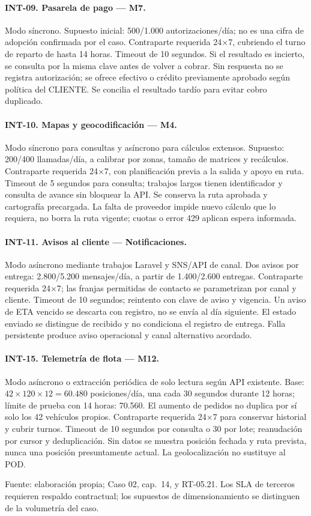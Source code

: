 \paragraph{INT-09. Pasarela de pago --- M7.}
Modo síncrono. Supuesto inicial: 500/1.000 autorizaciones/día; no es una cifra de adopción confirmada por el caso. Contraparte requerida 24$\times$7, cubriendo el turno de reparto de hasta 14 horas. Timeout de 10 segundos. Si el resultado es incierto, se consulta por la misma clave antes de volver a cobrar. Sin respuesta no se registra autorización; se ofrece efectivo o crédito previamente aprobado según política del CLIENTE. Se concilia el resultado tardío para evitar cobro duplicado.

\paragraph{INT-10. Mapas y geocodificación --- M4.}
Modo síncrono para consultas y asíncrono para cálculos extensos. Supuesto: 200/400 llamadas/día, a calibrar por zonas, tamaño de matrices y recálculos. Contraparte requerida 24$\times$7, con planificación previa a la salida y apoyo en ruta. Timeout de 5 segundos para consulta; trabajos largos tienen identificador y consulta de avance sin bloquear la API. Se conserva la ruta aprobada y cartografía precargada. La falta de proveedor impide nuevo cálculo que lo requiera, no borra la ruta vigente; cuotas o error 429 aplican espera informada.

\paragraph{INT-11. Avisos al cliente --- Notificaciones.}
Modo asíncrono mediante trabajos Laravel y SNS/API de canal. Dos avisos por entrega: 2.800/5.200 mensajes/día, a partir de 1.400/2.600 entregas. Contraparte requerida 24$\times$7; las franjas permitidas de contacto se parametrizan por canal y cliente. Timeout de 10 segundos; reintento con clave de aviso y vigencia. Un aviso de ETA vencido se descarta con registro, no se envía al día siguiente. El estado enviado se distingue de recibido y no condiciona el registro de entrega. Falla persistente produce aviso operacional y canal alternativo acordado.

\paragraph{INT-15. Telemetría de flota --- M12.}
Modo asíncrono o extracción periódica de solo lectura según API existente. Base: $42\times120\times12=60.480$ posiciones/día, una cada 30 segundos durante 12 horas; límite de prueba con 14 horas: 70.560. El aumento de pedidos no duplica por sí solo los 42 vehículos propios. Contraparte requerida 24$\times$7 para conservar historial y cubrir turnos. Timeout de 10 segundos por consulta o 30 por lote; reanudación por cursor y deduplicación. Sin datos se muestra posición fechada y ruta prevista, nunca una posición presuntamente actual. La geolocalización no sustituye al POD.

{\footnotesize Fuente: elaboración propia; Caso 02, cap.~14, y RT-05.21. Los SLA de terceros requieren respaldo contractual; los supuestos de dimensionamiento se distinguen de la volumetría del caso.\par}
